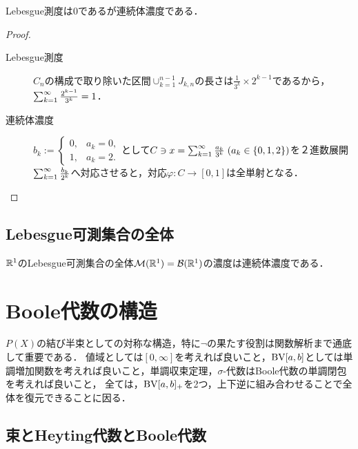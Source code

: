 \documentclass[uplatex, dvipdfmx]{jsreport}
\begin{document}
\begin{proposition}[サイズと長さとの概念の違い]
    Lebesgue測度は$0$であるが連続体濃度である．
\end{proposition}
\begin{proof}\mbox{}
    \begin{description}
        \item[Lebesgue測度] $C_n$の構成で取り除いた区間$\cup_{k=1}^{n-1}J_{k,n}$の長さは$\frac{1}{3^k}\times 2^{k-1}$であるから，$\sum_{k=1}^\infty\frac{2^{k-1}}{3^k}=1$．
        \item[連続体濃度] $b_k:=\begin{cases}0,&a_k=0,\\1,&a_k=2.\end{cases}$として$C\ni x=\sum_{k=1}^\infty\frac{a_k}{3^k}\;(a_k\in\{0,1,2\})$を２進数展開$\sum_{k=1}^\infty\frac{b_k}{2^k}$へ対応させると，対応$\varphi:C\to[0,1]$は全単射となる．
    \end{description}
\end{proof}

\subsection{Lebesgue可測集合の全体}

\begin{corollary}
    $\mathbb{R}^1$のLebesgue可測集合の全体$\mathcal{M}(\mathbb{R}^1)=\mathcal{B}(\mathbb{R}^1)$の濃度は連続体濃度である．
\end{corollary}

\section{Boole代数の構造}

\begin{tcolorbox}[colframe=ForestGreen, colback=ForestGreen!10!white,breakable,colbacktitle=ForestGreen!40!white,coltitle=black,fonttitle=\bfseries\sffamily,
title=解析学で最も大事な構造：完備Boole代数]
    $P(X)$の結び半束としての対称な構造，特に$\lnot$の果たす役割は関数解析まで通底して重要である．
    値域としては$[0,\infty]$を考えれば良いこと，$\mathrm{BV}[a,b]$としては単調増加関数を考えれば良いこと，単調収束定理，$\sigma$-代数はBoole代数の単調閉包を考えれば良いこと，
    全ては，$\mathrm{BV}[a,b]_+$を2つ，上下逆に組み合わせることで全体を復元できることに因る．
\end{tcolorbox}

\subsection{束とHeyting代数とBoole代数}
\end{document}
